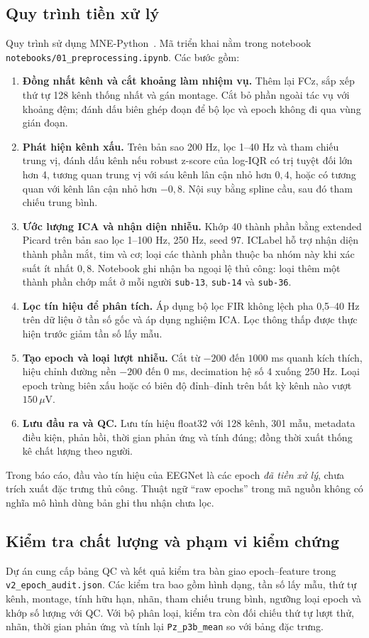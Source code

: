 \documentclass[11pt,a4paper]{article}
\newcommand{\code}[1]{\nolinkurl{#1}}
\begin{document}
\subsection{Quy trình tiền xử lý}
Quy trình sử dụng MNE-Python~\cite{mne}. Mã triển khai nằm trong notebook \code{notebooks/01_preprocessing.ipynb}. Các bước gồm:
\begin{enumerate}
\item \textbf{Đồng nhất kênh và cắt khoảng làm nhiệm vụ.} Thêm lại FCz, sắp xếp thứ tự 128 kênh thống nhất và gán montage. Cắt bỏ phần ngoài tác vụ với khoảng đệm; đánh dấu biên ghép đoạn để bộ lọc và epoch không đi qua vùng gián đoạn.
\item \textbf{Phát hiện kênh xấu.} Trên bản sao 200 Hz, lọc 1--40 Hz và tham chiếu trung vị, đánh dấu kênh nếu robust z-score của log-IQR có trị tuyệt đối lớn hơn 4, tương quan trung vị với sáu kênh lân cận nhỏ hơn $0{,}4$, hoặc có tương quan với kênh lân cận nhỏ hơn $-0{,}8$. Nội suy bằng spline cầu, sau đó tham chiếu trung bình.
\item \textbf{Ước lượng ICA và nhận diện nhiễu.} Khớp 40 thành phần bằng extended Picard trên bản sao lọc 1--100 Hz, 250 Hz, seed 97. ICLabel hỗ trợ nhận diện thành phần mắt, tim và cơ; loại các thành phần thuộc ba nhóm này khi xác suất ít nhất $0{,}8$. Notebook ghi nhận ba ngoại lệ thủ công: loại thêm một thành phần chớp mắt ở mỗi người \code{sub-13}, \code{sub-14} và \code{sub-36}.
\item \textbf{Lọc tín hiệu để phân tích.} Áp dụng bộ lọc FIR không lệch pha 0,5--40 Hz trên dữ liệu ở tần số gốc và áp dụng nghiệm ICA. Lọc thông thấp được thực hiện trước giảm tần số lấy mẫu.
\item \textbf{Tạo epoch và loại lượt nhiễu.} Cắt từ $-200$ đến $1000$ ms quanh kích thích, hiệu chỉnh đường nền $-200$ đến 0 ms, decimation hệ số 4 xuống 250 Hz. Loại epoch trùng biên xấu hoặc có biên độ đỉnh--đỉnh trên bất kỳ kênh nào vượt $150\,\mu$V.
\item \textbf{Lưu đầu ra và QC.} Lưu tín hiệu float32 với 128 kênh, 301 mẫu, metadata điều kiện, phản hồi, thời gian phản ứng và tính đúng; đồng thời xuất thống kê chất lượng theo người.
\end{enumerate}
Trong báo cáo, đầu vào tín hiệu của EEGNet là các epoch \emph{đã tiền xử lý}, chưa trích xuất đặc trưng thủ công. Thuật ngữ ``raw epochs'' trong mã nguồn không có nghĩa mô hình dùng bản ghi thu nhận chưa lọc.

\subsection{Kiểm tra chất lượng và phạm vi kiểm chứng}
Dự án cung cấp bảng QC và kết quả kiểm tra bàn giao epoch--feature trong \code{v2_epoch_audit.json}. Các kiểm tra bao gồm hình dạng, tần số lấy mẫu, thứ tự kênh, montage, tính hữu hạn, nhãn, tham chiếu trung bình, ngưỡng loại epoch và khớp số lượng với QC. Với bộ phân loại, kiểm tra còn đối chiếu thứ tự lượt thử, nhãn, thời gian phản ứng và tính lại \code{Pz_p3b_mean} so với bảng đặc trưng.
\end{document}
